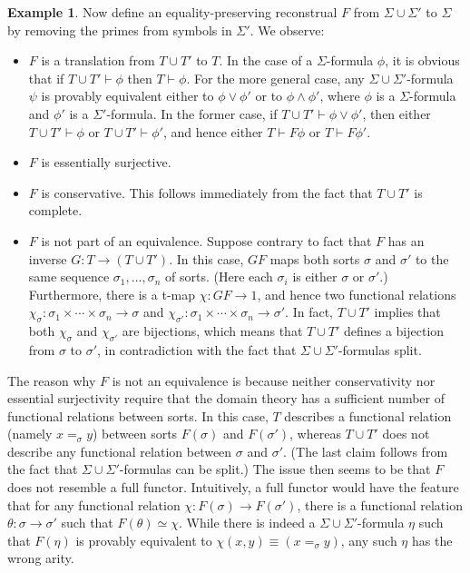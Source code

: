 \documentclass[12pt]{article}
\theoremstyle{definition}
\newtheorem{example}[prop]{Example}
\theoremstyle{remark}
\newcommand{\3}{\mathcal}
\begin{document}
\begin{example}
  Now define an equality-preserving reconstrual $F$ from
  $\Sigma\cup \Sigma '$ to $\Sigma$ by removing the primes from
  symbols in $\Sigma '$. We observe:
  \begin{itemize}
  \item $F$ is a translation from $T\cup T'$ to $T$. In the case of a
    $\Sigma$-formula $\phi$, it is obvious that if
    $T\cup T'\vdash\phi$ then $T\vdash\phi$. For the more general
    case, any $\Sigma\cup \Sigma '$-formula $\psi$ is provably
    equivalent either to $\phi \vee \phi '$ or to $\phi \wedge\phi '$,
    where $\phi$ is a $\Sigma$-formula and $\phi '$ is a
    $\Sigma '$-formula. In the former case, if
    $T\cup T'\vdash \phi \vee \phi '$, then either
    $T\cup T'\vdash \phi$ or $T\cup T'\vdash \phi '$, and hence either
    $T\vdash F\phi$ or $T\vdash F\phi '$.
  \item $F$ is essentially surjective.
  \item $F$ is conservative. This follows immediately from the fact
    that $T\cup T'$ is complete.
  \item $F$ is not part of an equivalence. Suppose contrary to fact
    that $F$ has an inverse $G:T\to (T\cup T')$. In this case, $GF$
    maps both sorts $\sigma$ and $\sigma '$ to the same sequence
    $\sigma _1,\dots ,\sigma _n$ of sorts. (Here each $\sigma _i$ is
    either $\sigma$ or $\sigma '$.)  Furthermore, there is a t-map
    $\chi :GF\to 1$, and hence two functional relations
    $\chi _\sigma :\sigma _1\times\cdots\times \sigma _n\to \sigma$
    and
    $\chi _{\sigma '}:\sigma _1\times \cdots \times \sigma _n\to
    \sigma '$.  In fact, $T\cup T'$ implies that both $\chi _\sigma$
    and $\chi _{\sigma '}$ are bijections, which means that $T\cup T'$
    defines a bijection from $\sigma$ to $\sigma '$, in contradiction
    with the fact that $\Sigma\cup\Sigma '$-formulas split.
  \end{itemize}
  The reason why $F$ is not an equivalence is because neither
  conservativity nor essential surjectivity require that the domain
  theory has a sufficient number of functional relations between
  sorts. In this case, $T$ describes a functional relation (namely
  $x=_\sigma y$) between sorts $F(\sigma )$ and $F(\sigma ')$, whereas
  $T\cup T'$ does not describe any functional relation between
  $\sigma$ and $\sigma '$.  (The last claim follows from the fact that
  $\Sigma\cup\Sigma '$-formulas can be split.) The issue then seems to
  be that $F$ does not resemble a full functor. Intuitively, a full
  functor would have the feature that for any functional relation
  $\chi :F(\sigma )\to F(\sigma ')$, there is a functional relation
  $\theta :\sigma \to \sigma '$ such that $F(\theta )\simeq
  \chi$. While there is indeed a $\Sigma\cup \Sigma '$-formula $\eta$
  such that $F(\eta )$ is provably equivalent to
  $\chi (x,y)\equiv (x=_\sigma y)$, any such $\eta$ has the wrong
  arity.


\end{example}
\end{document}
